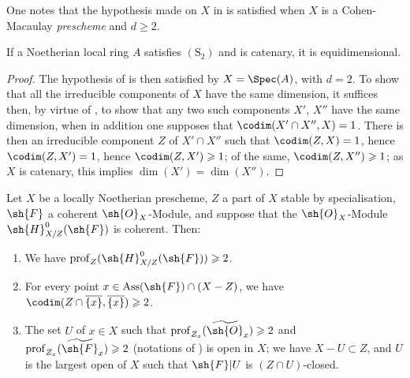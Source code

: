 One notes that the hypothesis made on $X$ in  is satisfied when $X$ is a Cohen-Macaulay \emph{prescheme} and $d\geqslant 2$.

\begin{corollary}[5.10.9]
\label{IV.5.10.9}
If a Noetherian local ring $A$ satisfies $(\mathrm{S}_2)$ and is catenary, it is equidimensional.
\end{corollary}

\begin{proof}
The hypothesis of  is then satisfied by $X=\Spec(A)$, with $d=2$.
To show that all the irreducible components of $X$ have the same dimension, it suffices then, by virtue of , to show that any two such components $X'$, $X''$ have the same dimension, when in addition one supposes that $\codim(X'\cap X'',X)=1$.
There is then an irreducible component $Z$ of $X'\cap X''$ such that $\codim(Z,X)=1$, hence $\codim(Z,X')=1$, hence $\codim(Z,X')\geqslant 1$; of the same, $\codim(Z,X'')\geqslant 1$; as $X$ is catenary, this implies $\dim(X')=\dim(X'')$.
\end{proof}

\begin{proposition}[5.10.10]
\label{IV.5.10.10}
Let $X$ be a locally Noetherian prescheme, $Z$ a part of $X$ stable by specialisation, $\sh{F}$ a coherent $\sh{O}_X$-Module, and suppose that the $\sh{O}_X$-Module $\sh{H}^0_{X/Z}(\sh{F})$ is coherent.
Then:
\begin{enumerate}[label=\emph{\roman*)}]
  \item We have $\operatorname{prof}_Z(\sh{H}^0_{X/Z}(\sh{F}))\geqslant 2$.
  \item For every point $x\in\operatorname{Ass}(\sh{F})\cap(X-Z)$, we have $\codim(Z\cap\overline{\{x\}},\overline{\{x\}})\geqslant 2$.
  \item The set $U$ of $x\in X$ such that $\operatorname{prof}_{Z_x}(\widetilde{\sh{O}}_x)\geqslant 2$ and $\operatorname{prof}_{Z_x}(\widetilde{\sh{F}}_x)\geqslant 2$ (notations of ) is open in $X$; we have $X-U\subset Z$, and $U$ is the largest open of $X$ such that $\sh{F}|U$ is $(Z\cap U)$-closed.


\end{enumerate}
\end{proposition}

